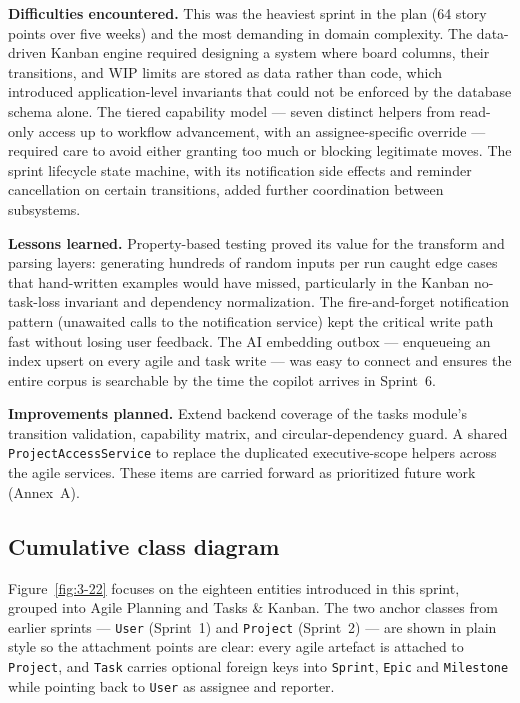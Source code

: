 \textbf{Difficulties encountered.} This was the heaviest sprint in the plan (64 story points over
five weeks) and the most demanding in domain complexity. The data-driven Kanban engine required
designing a system where board columns, their transitions, and WIP limits are stored as data
rather than code, which introduced application-level invariants that could not be enforced by the
database schema alone. The tiered capability model --- seven distinct helpers from read-only
access up to workflow advancement, with an assignee-specific override --- required care to avoid
either granting too much or blocking legitimate moves. The sprint lifecycle state
machine, with its notification side effects and reminder cancellation on certain transitions,
added further coordination between subsystems.

\textbf{Lessons learned.} Property-based testing proved its value for the transform and parsing
layers: generating hundreds of random inputs per run caught edge cases that hand-written examples
would have missed, particularly in the Kanban no-task-loss invariant and dependency normalization.
The fire-and-forget notification pattern (unawaited calls to the notification service) kept the
critical write path fast without losing user feedback. The AI embedding outbox --- enqueueing
an index upsert on every agile and task write --- was easy to connect and ensures the
entire corpus is searchable by the time the copilot arrives in Sprint~6.

\textbf{Improvements planned.} Extend backend coverage of the tasks module's transition
validation, capability matrix, and circular-dependency guard. A shared
\texttt{ProjectAccessService} to replace the duplicated executive-scope helpers across the agile
services. These items are carried forward as prioritized future work (Annex~A).

\subsection{Cumulative class diagram}

Figure~\ref{fig:3-22} focuses on the eighteen entities introduced in this sprint, grouped into
Agile Planning and Tasks \& Kanban. The two anchor classes from earlier sprints ---
\texttt{User} (Sprint~1) and \texttt{Project} (Sprint~2) --- are shown in plain style so the
attachment points are clear: every agile artefact is attached to \texttt{Project}, and \texttt{Task}
carries optional foreign keys into \texttt{Sprint}, \texttt{Epic} and \texttt{Milestone} while
pointing back to \texttt{User} as assignee and reporter.

